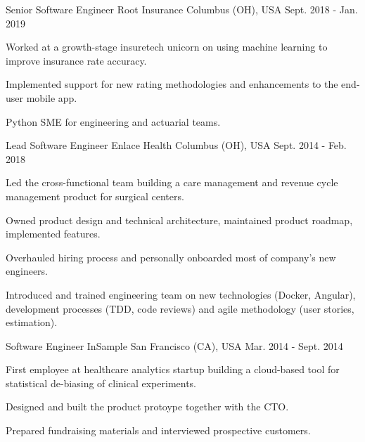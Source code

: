 \begin{cventries}
  \cventry
    {Senior Software Engineer} %
    {Root Insurance} %
    {Columbus (OH), USA} %
    {Sept. 2018 - Jan. 2019} %
    {
      \begin{cvitems} %
        \item {Worked at a growth-stage insuretech unicorn on using machine learning to improve insurance rate accuracy.}
        \item {Implemented support for new rating methodologies and enhancements to the end-user mobile app.}
        \item {Python SME for engineering and actuarial teams.}
      \end{cvitems}
    }

  \cventry
    {Lead Software Engineer} %
    {Enlace Health} %
    {Columbus (OH), USA} %
    {Sept. 2014 - Feb. 2018} %
    {
      \begin{cvitems} %
        \item {Led the cross-functional team building a care management and revenue cycle management product for surgical centers.}
        \item {Owned product design and technical architecture, maintained product roadmap, implemented features.}
        \item {Overhauled hiring process and personally onboarded most of company's new engineers.}
        \item {Introduced and trained engineering team on new technologies (Docker, Angular), development processes (TDD, code reviews) and agile methodology (user stories, estimation).}
      \end{cvitems}
    }

  \cventry
    {Software Engineer} %
    {InSample} %
    {San Francisco (CA), USA} %
    {Mar. 2014 - Sept. 2014} %
    {
      \begin{cvitems} %
        \item {First employee at healthcare analytics startup building a cloud-based tool for statistical de-biasing of clinical experiments.}
        \item {Designed and built the product protoype together with the CTO.}
        \item {Prepared fundraising materials and interviewed prospective customers.}
      \end{cvitems}
    }


\end{cventries}
